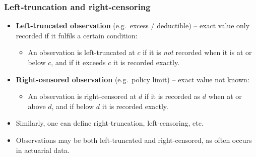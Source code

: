 \documentclass[11pt]{article}
\newcommand{\noi}{\noindent}
\begin{document}
\subsubsection{Left‐truncation and right‐censoring}
\noi
\begin{itemize}
  \item \textbf{Left‐truncated observation} (e.g.\ excess / deductible) – exact value only recorded if it fulfils a certain condition:
    \begin{itemize}
      \item An observation is left‐truncated at \(c\) if it is \emph{not} recorded when it is at or below \(c\), and if it exceeds \(c\) it is recorded exactly.
    \end{itemize}
  \item \textbf{Right‐censored observation} (e.g.\ policy limit) – exact value not known:
    \begin{itemize}
      \item An observation is right‐censored at \(d\) if it is recorded as \(d\) when at or above \(d\), and if below \(d\) it is recorded exactly.
    \end{itemize}
  \item Similarly, one can define right‐truncation, left‐censoring, etc.
  \item Observations may be both left‐truncated and right‐censored, as often occurs in actuarial data.
\end{itemize}
\end{document}
